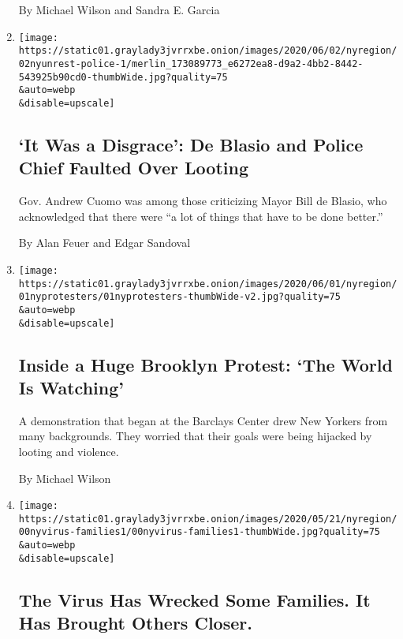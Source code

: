 \begin{enumerate}
  By Michael Wilson and Sandra E. Garcia
\item
  \href{/2020/06/02/nyregion/nyc-looting-protests-nypd.html}{}

  \texttt{[image: https://static01.graylady3jvrrxbe.onion/images/2020/06/02/nyregion/02nyunrest-police-1/merlin\_173089773\_e6272ea8-d9a2-4bb2-8442-543925b90cd0-thumbWide.jpg?quality=75\\\&auto=webp\\\&disable=upscale]}

  \hypertarget{it-was-a-disgrace-de-blasio-and-police-chief-faulted-over-looting}{%
  \subsection{`It Was a Disgrace': De Blasio and Police Chief Faulted
  Over
  Looting}\label{it-was-a-disgrace-de-blasio-and-police-chief-faulted-over-looting}}

  Gov. Andrew Cuomo was among those criticizing Mayor Bill de Blasio,
  who acknowledged that there were ``a lot of things that have to be
  done better.''

  By Alan Feuer and Edgar Sandoval
\item
  \href{/2020/06/01/nyregion/protesters-ny-floyd.html}{}

  \texttt{[image: https://static01.graylady3jvrrxbe.onion/images/2020/06/01/nyregion/01nyprotesters/01nyprotesters-thumbWide-v2.jpg?quality=75\\\&auto=webp\\\&disable=upscale]}

  \hypertarget{inside-a-huge-brooklyn-protest-the-world-is-watching}{%
  \subsection{Inside a Huge Brooklyn Protest: `The World Is
  Watching'}\label{inside-a-huge-brooklyn-protest-the-world-is-watching}}

  A demonstration that began at the Barclays Center drew New Yorkers
  from many backgrounds. They worried that their goals were being
  hijacked by looting and violence.

  By Michael Wilson
\item
  \href{/2020/05/24/nyregion/coronavirus-nyc-families.html}{}

  \texttt{[image: https://static01.graylady3jvrrxbe.onion/images/2020/05/21/nyregion/00nyvirus-families1/00nyvirus-families1-thumbWide.jpg?quality=75\\\&auto=webp\\\&disable=upscale]}

  \hypertarget{the-virus-has-wrecked-some-families-it-has-brought-others-closer}{%
  \subsection{The Virus Has Wrecked Some Families. It Has Brought Others
  Closer.}\label{the-virus-has-wrecked-some-families-it-has-brought-others-closer}}


\end{enumerate}
